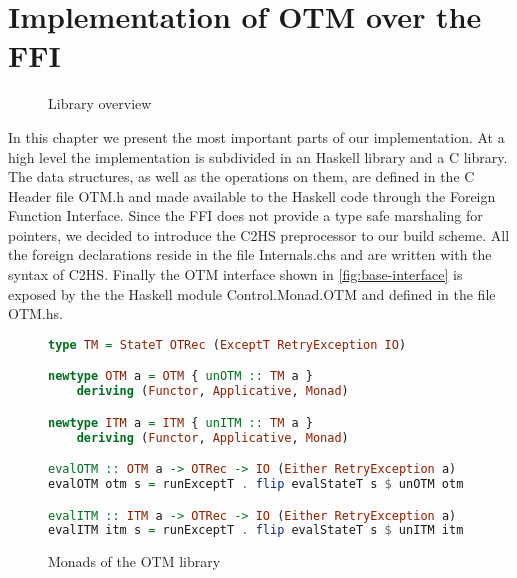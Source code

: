 
\chapter{Implementation of OTM over the FFI}

\label{chap:implementation}
\begin{wrapfigure}{r}{0.27\textwidth}
\vspace{-30pt}
\centering
    \caption{Library overview}
\end{wrapfigure}

In this chapter we present the most important parts of our implementation.
At a high level the implementation is subdivided in an Haskell library and a C library.
The data structures, as well as the operations on them, are defined in the C Header file OTM.h and made available to the Haskell code through the Foreign Function Interface.
Since the FFI does not provide a type safe marshaling for pointers, we decided to introduce the C2HS preprocessor to our build scheme.
All the foreign declarations reside in the file Internals.chs and are written with the syntax of C2HS.\cite{Chakravarty2000}
Finally the OTM interface shown in \cref{fig:base-interface} is exposed by the the Haskell module Control.Monad.OTM and defined in the file OTM.hs.

\begin{figure}[b]
\vspace{-14pt}
\begin{lstlisting}[language=Haskell]
type TM = StateT OTRec (ExceptT RetryException IO)

newtype OTM a = OTM { unOTM :: TM a }
    deriving (Functor, Applicative, Monad)

newtype ITM a = ITM { unITM :: TM a }
    deriving (Functor, Applicative, Monad)

evalOTM :: OTM a -> OTRec -> IO (Either RetryException a)
evalOTM otm s = runExceptT . flip evalStateT s $ unOTM otm

evalITM :: ITM a -> OTRec -> IO (Either RetryException a)
evalITM itm s = runExceptT . flip evalStateT s $ unITM itm
\end{lstlisting}
\caption{Monads of the OTM library}
\label{fig:monads}
\end{figure}

